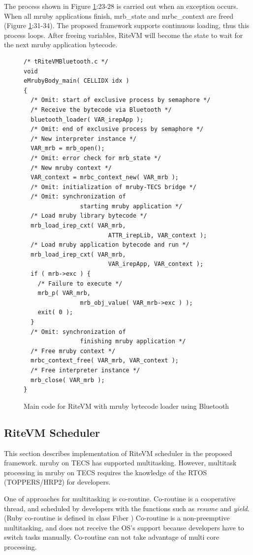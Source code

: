 \documentclass{sig-alternate-05-2015}
\begin{document}
The process shown in Figure \ref{maincode_mrubybluetooth}:23-28 is carried out when an exception occurs.
When all mruby applications finish, mrb\_state and mrbc\_context are freed (Figure \ref{maincode_mrubybluetooth}:31-34).
The proposed framework supports continuous loading, thus this process loops.
After freeing variables, RiteVM will become the state to wait for the next mruby application bytecode.
\begin{figure}[t]
\centering
\begin{lstlisting}
/* tRiteVMBluetooth.c */
void
eMrubyBody_main( CELLIDX idx )
{
  /* Omit: start of exclusive process by semaphore */
  /* Receive the bytecode via Bluetooth */
  bluetooth_loader( VAR_irepApp );
  /* Omit: end of exclusive process by semaphore */
  /* New interpreter instance */
  VAR_mrb = mrb_open();
  /* Omit: error check for mrb_state */
  /* New mruby context */
  VAR_context = mrbc_context_new( VAR_mrb );
  /* Omit: initialization of mruby-TECS bridge */
  /* Omit: synchronization of
                starting mruby application */
  /* Load mruby library bytecode */
  mrb_load_irep_cxt( VAR_mrb,
                        ATTR_irepLib, VAR_context );
  /* Load mruby application bytecode and run */
  mrb_load_irep_cxt( VAR_mrb,
                        VAR_irepApp, VAR_context );
  if ( mrb->exc ) {
    /* Failure to execute */
    mrb_p( VAR_mrb, 
                mrb_obj_value( VAR_mrb->exc ) );
    exit( 0 );
  }
  /* Omit: synchronization of
                finishing mruby application */
  /* Free mruby context */
  mrbc_context_free( VAR_mrb, VAR_context );
  /* Free interpreter instance */
  mrb_close( VAR_mrb );
}

\end{lstlisting}
\caption{Main code for RiteVM with mruby bytecode loader using Bluetooth}
\label{maincode_mrubybluetooth}
\end{figure}
\subsection{RiteVM Scheduler}
\label{sec:RiteVM Scheduler}
This section describes implementation of RiteVM scheduler in the proposed framework.
mruby on TECS has supported multitasking.
However, multitask processing in mruby on TECS requires the knowledge of the RTOS (TOPPERS/HRP2) for developers.

One of approaches for multitasking is co-routine.
Co-routine is a cooperative thread, and scheduled by developers with the functions such as {\it resume} and {\it yield}. 
(Ruby co-routine is defined in class Fiber \cite{url:co-routine})
Co-routine is a non-preemptive multitasking, and does not receive the OS's support because developers have to switch tasks manually.
Co-routine can not take advantage of multi core processing.
\end{document}

